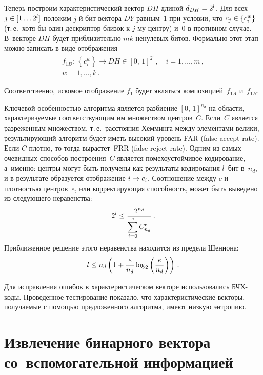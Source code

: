 \begin{multicols}{2}
      Теперь построим характеристический вектор $DH$ длиной $d_{DH}\hm = 2^l$. Для 
всех $j\hm\in [1\ldots 2^l]$ положим $j$-й бит вектора $DY$ равным~1 при условии, что 
$c_j\hm\in \left\{ c_i^w\right\}$ (т.\,е.\ хотя бы один дескриптор близок к $j$-му центру) 
и~0 в противном случае. В~векторе $DH$ будет приблизительно $mk$ ненулевых битов. 
Формально этот этап можно записать в виде отоб\-ра\-жения
      \begin{multline*}
      f_{1B}:\ \left\{ c_i^w\right\}\rightarrow DH\in [0,\,1]^{2^l}\,,\quad i=1, \ldots ,m\,,\\ 
w=1,\ldots , k\,.
      \end{multline*}
      
      Соответственно, искомое отображение $f_1$ будет являться 
композицией~$f_{1A}$ и~$f_{1B}$.
      
      Ключевой особенностью алгоритма является разбиение $[0,\,1]^{n_d}$ на области, 
характеризуемые соответствующим им множеством центров~$C$. Если~$C$ является 
разреженным множеством, т.\,е.\ расстояния Хемминга между элементами велики, 
результирующий алгоритм будет иметь высокий уровень FAR (false accept rate). 
Если $C$ плот\-но, то тогда вырастет~FRR (false reject rate). 
Одним из самых очевидных способов построения~$C$ является 
помехоустойчивое кодирование, а~именно: центры могут быть получены как результаты 
кодирования $l$~бит в~$n_d$, и в результате образуется отображение $i\hm\rightarrow c_i$. 
Соотношение между $c$ и плотностью центров~$e$, или корректирующая способность, 
может быть выведено из следующего неравенства:
      \begin{equation*}
      2^l\leq \displaystyle\frac{\displaystyle 2^{n_d}\mathstrut}{\displaystyle \sum\limits_{i=0}^e C^e_{n_d}\mathstrut}\,.
      \end{equation*}
      Приближенное решение этого неравенства находится из предела Шеннона:
      \begin{equation*}
      l\leq n_d\left( 1+\displaystyle\frac{\displaystyle e\mathstrut}{\displaystyle n_d\mathstrut}\log_2\left( \displaystyle\frac{\displaystyle e\mathstrut}{\displaystyle n_d\mathstrut}\right)\right)\,.
      \end{equation*}
      
      Для исправления ошибок в характеристическом векторе использовались 
      БЧХ-ко\-ды. Проведенное тестирование показало, что характеристические векторы, 
получаемые с помощью предложенного алгоритма, имеют низкую энтропию. 

\section{Извлечение бинарного вектора со~вспомогательной 
информацией}


\end{multicols}
